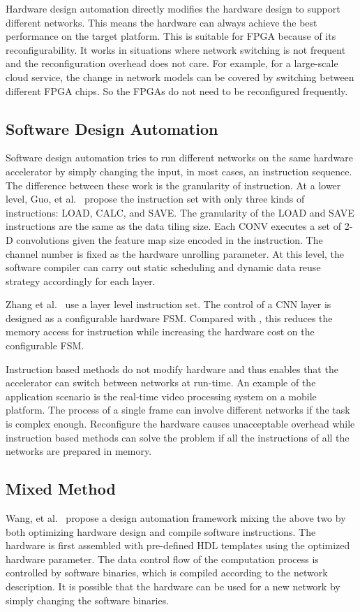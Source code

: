Hardware design automation directly modifies the hardware design to support different networks. This means the hardware can always achieve the best performance on the target platform. This is suitable for FPGA because of its reconfigurability. It works in situations where network switching is not frequent and the reconfiguration overhead does not care. For example, for a large-scale cloud service, the change in network models can be covered by switching between different FPGA chips. So the FPGAs do not need to be reconfigured frequently.

\subsection{Software Design Automation}

Software design automation tries to run different networks on the same hardware accelerator by simply changing the input, in most cases, an instruction sequence. The difference between these work is the granularity of instruction. At a lower level, Guo, et al.~\cite{guo2017angel} propose the instruction set with only three kinds of instructions: LOAD, CALC, and SAVE. The granularity of the LOAD and SAVE instructions are the same as the data tiling size. Each CONV executes a set of 2-D convolutions given the feature map size encoded in the instruction. The channel number is fixed as the hardware unrolling parameter. At this level, the software compiler can carry out static scheduling and dynamic data reuse strategy accordingly for each layer. 

Zhang et al.~\cite{zhang2016caffeine} use a layer level instruction set. The control of a CNN layer is designed as a configurable hardware FSM. Compared with \cite{guo2017angel}, this reduces the memory access for instruction while increasing the hardware cost on the configurable FSM.

Instruction based methods do not modify hardware and thus enables that the accelerator can switch between networks at run-time. An example of the application scenario is the real-time video processing system on a mobile platform. The process of a single frame can involve different networks if the task is complex enough. Reconfigure the hardware causes unacceptable overhead while instruction based methods can solve the problem if all the instructions of all the networks are prepared in memory.

\subsection{Mixed Method}
Wang, et al.~\cite{wang2016deepburning} propose a design automation framework mixing the above two by both optimizing hardware design and compile software instructions. The hardware is first assembled with pre-defined HDL templates using the optimized hardware parameter. The data control flow of the computation process is controlled by software binaries, which is compiled according to the network description. It is possible that the hardware can be used for a new network by simply changing the software binaries.

